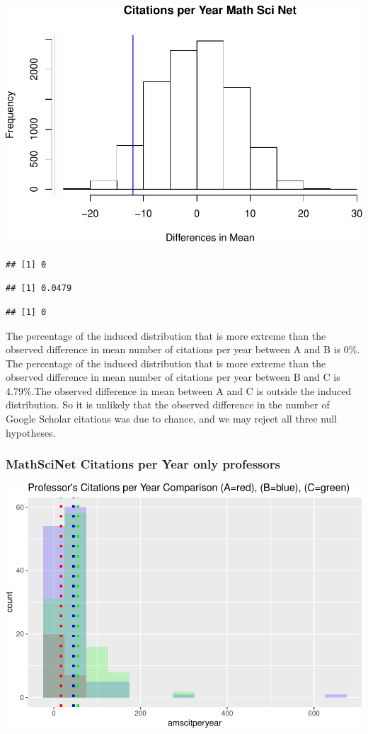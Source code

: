 \documentclass[]{article}
\begin{document}
\includegraphics{final_files/figure-latex/unnamed-chunk-35-1.pdf}

\begin{verbatim}
## [1] 0
\end{verbatim}

\begin{verbatim}
## [1] 0.0479
\end{verbatim}

\begin{verbatim}
## [1] 0
\end{verbatim}

The percentage of the induced distribution that is more extreme than the
observed difference in mean number of citations per year between A and B
is 0\%. The percentage of the induced distribution that is more extreme
than the observed difference in mean number of citations per year
between B and C is 4.79\%.The observed difference in mean between A and
C is outside the induced distribution. So it is unlikely that the
observed difference in the number of Google Scholar citations was due to
chance, and we may reject all three null hypotheses.

\hypertarget{mathscinet-citations-per-year-only-professors}{%
\subsubsection{MathSciNet Citations per Year only
professors}\label{mathscinet-citations-per-year-only-professors}}

\includegraphics{final_files/figure-latex/unnamed-chunk-37-1.pdf}
\end{document}
